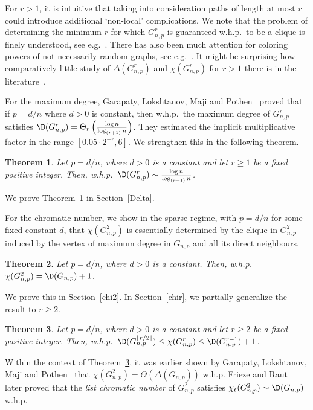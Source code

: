 \documentclass[12pt,a4paper]{article}
\newtheorem{theorem}{Theorem}
\newcommand{\rdown}[1]{{\left\lfloor #1\right \rfloor}}
\theoremstyle{plain}
\begin{document}
For $r>1$, it is intuitive that taking into consideration paths of length at most $r$ could introduce additional `non-local' complications. 
We note that the problem of determining the minimum $r$ for which $G_{n,p}^r$ is guaranteed w.h.p.~to be a clique is finely understood, see e.g.~\cite{Bol81,KlLa81,RiWo10,ABG12}.
There has also been much attention for coloring powers of not-necessarily-random graphs, see e.g.~\cite{AlMo02,AgHa03,HHMR08+,AEH13,KaPi16,KaPi18,KaLo19}.
It might be surprising how comparatively little study of $\Delta(G_{n,p}^r)$ and $\chi(G_{n,p}^r)$ for $r>1$ there is in the literature~\cite{AtFr04,GLMP23,FrRa23+}.

For the maximum degree, Garapaty, Lokshtanov, Maji and Pothen~\cite{GLMP23} proved that if $p=d/n$ where $d>0$ is constant, then w.h.p.~the maximum degree of $G_{n,p}^r$ satisfies $\D(G_{n,p}^r)=\Theta_r\left(\frac{\log n}{\log_{(r+1)} n}\right)$. They estimated the implicit multiplicative factor in the range $[0.05\cdot 2^{-r}, 6]$. We strengthen this in the following theorem.

\begin{theorem}\label{th1}
Let $p=d/n$, where $d>0$ is a constant and let $r\geq 1$ be a fixed positive integer. Then, w.h.p.~$\D(G_{n,p}^r) \sim\frac{\log n}{\log_{(r+1)} n}$.
\end{theorem}
\noindent
We prove Theorem~\ref{th1} in Section~\ref{Delta}.

For the chromatic number, we show in the sparse regime, with $p=d/n$ for some fixed constant $d$, that $\chi(G_{n,p}^2)$ is essentially determined by the clique in $G_{n,p}^2$ induced by the vertex of maximum degree in $G_{n,p}$ and all its direct neighbours. 
\begin{theorem}\label{th2}
Let $p=d/n$, where $d>0$ is a constant. Then, w.h.p.~$\chi(G_{n,p}^2) =\D(G_{n,p})+1$.
\end{theorem}
\noindent
We prove this in Section~\ref{chi2}. In Section~\ref{chir}, we partially generalize the result to $r\geq 2$.
\begin{theorem}\label{th3}
Let $p=d/n$, where $d>0$ is a constant and let $r\geq 2$ be a fixed positive integer. Then, w.h.p.~$\D(G_{n,p}^{\rdown{r/2}})\leq \chi(G_{n,p}^r)\leq \D(G_{n,p}^{r-1})+1$.
\end{theorem}
\noindent
Within the context of Theorem~\ref{th3}, it was earlier shown by Garapaty, Lokshtanov, Maji and Pothen~\cite{GLMP23} that $\chi(G_{n,p}^2) = \Theta(\Delta(G_{n,p}))$ w.h.p. Frieze and Raut~\cite{FrRa23+} later proved that the {\em list chromatic number} of $G_{n,p}^2$ satisfies $\chi_\ell(G_{n,p}^2)\sim \D(G_{n,p})$ w.h.p.
\end{document}

